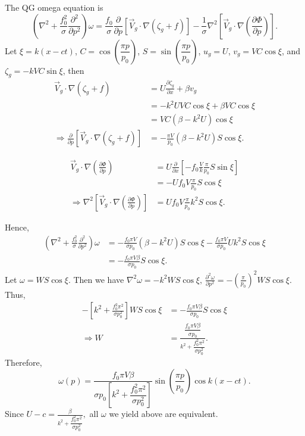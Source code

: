 \documentclass[11pt,a4paper]{article}
\begin{document}
{\begin{enumerate}[label=(\alph*)]
\begin{solution}
The QG omega equation is
\[
    \left(\nabla^2+\frac{f_0^2}{\sigma}\frac{\partial^2}{\partial p^2}\right)\omega
    =
    \frac{f_0}{\sigma}\frac{\partial}{\partial p}\left[\vec{V}_g\cdot\nabla(\zeta_g+f)\right]
    -\frac{1}{\sigma}\nabla^2\left[\vec{V}_g\cdot\nabla\left(\frac{\partial\Phi}{\partial p}\right)\right].
\]
Let $\xi=k(x-ct)$, $C=\cos\left(\dfrac{\pi p}{p_0}\right)$, $S=\sin\left(\dfrac{\pi p}{p_0}\right)$, $u_g=U$, $v_g=VC\cos\xi$, and $\zeta_g=-kVC\sin\xi$, then 
\begin{align*}
    \vec{V}_g\cdot\nabla(\zeta_g+f)
    &=U\frac{\partial\zeta_g}{\partial x}+\beta v_g\\
    &=-k^2UVC\cos\xi+\beta VC\cos\xi\\
    &=VC(\beta-k^2U)\cos\xi\\
    \Rightarrow \frac{\partial}{\partial p}\left[\vec{V}_g\cdot\nabla(\zeta_g+f)\right]
    &=-\frac{\pi V}{p_0}(\beta-k^2U)S\cos\xi.
\end{align*}
    
\begin{align*}
    \vec{V}_g\cdot\nabla\left(\frac{\partial\Phi}{\partial p}\right)
    &=U\frac{\partial}{\partial x}\left[-f_0\frac{V}{k}\frac{\pi}{p_0}S\sin\xi\right]\\
    &=-Uf_0V\frac{\pi}{p_0}S\cos\xi\\
    \Rightarrow\nabla^2\left[\vec{V}_g\cdot\nabla\left(\frac{\partial\Phi}{\partial p}\right)\right]
    &=Uf_0V\frac{\pi}{p_0}k^2S\cos\xi.
\end{align*}
    
Hence,
\begin{align*}
    \left(\nabla^2+\frac{f_0^2}{\sigma}\frac{\partial^2}{\partial p^2}\right)\omega
    &=-\frac{f_0\pi V}{\sigma p_0}(\beta-k^2U)S\cos\xi-\frac{f_0\pi V}{\sigma p_0}Uk^2S\cos\xi\\
    &=-\frac{f_0\pi V\beta}{\sigma p_0}S\cos\xi.
\end{align*}
Let $\omega=WS\cos\xi$. Then we have $\displaystyle \nabla^2\omega=-k^2WS\cos\xi,\,
    \frac{\partial^2\omega}{\partial p^2}=-\left(\frac{\pi}{p_0}\right)^2WS\cos\xi.$
Thus,
\begin{align*}
    -\left[k^2+\frac{f_0^2\pi^2}{\sigma p_0^2}\right]WS\cos\xi
    &=-\frac{f_0\pi V\beta}{\sigma p_0}S\cos\xi\\
    \Rightarrow W&=\frac{\dfrac{f_0\pi V\beta}{\sigma p_0}}{k^2+\dfrac{f_0^2\pi^2}{\sigma p_0^2}}.
\end{align*}
Therefore,
\[
    \omega(p)=\frac{f_0\pi V\beta}{\sigma p_0\left[k^2+\dfrac{f_0^2\pi^2}{\sigma p_0^2}\right]}\sin\left(\frac{\pi p}{p_0}\right)\cos k(x-ct).
\]
Since $U-c=\frac{\beta}{k^2+\dfrac{f_0^2\pi^2}{\sigma p_0^2}},$ all $\omega$ we yield above are equivalent.


\end{solution}
\end{enumerate}}
\end{document}
